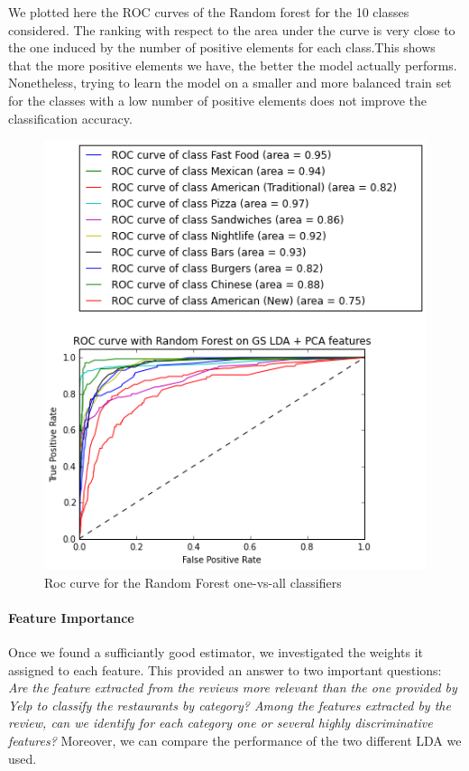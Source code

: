 \documentclass[twoside]{article}
\begin{document}
\begin{multicols}{2}
\noindent We plotted here the ROC curves of the Random forest for the 10 classes considered. The ranking with respect to the area under the curve is very close to the one induced by the number of positive elements for each class.This shows that the more positive elements we have, the better the model actually performs. Nonetheless, trying to learn the model on a smaller and more balanced train set for the classes with a low number of positive elements does not improve the classification accuracy.

\begin{figure}[H]
	\includegraphics[scale=0.55]{img/roc_rf.png}
	\centering
	\caption{Roc curve for the Random Forest one-vs-all classifiers}
\end{figure}


\paragraph{Feature Importance}

\noindent Once we found a sufficiantly good estimator, we investigated the weights it assigned to each feature. This provided an answer to two important questions: \textit{Are the feature extracted from the reviews more relevant than the one provided by Yelp to classify the restaurants by category? Among the features extracted by the review, can we identify for each category one or several highly discriminative features?} Moreover, we can compare the performance of the two different LDA we used.\\


\end{multicols}
\end{document}
